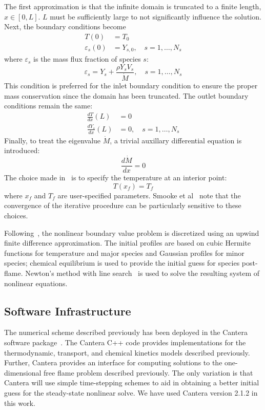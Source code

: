 The first approximation is that the infinite domain is truncated to a
finite length, $x\in[0,L]$. $L$ must be sufficiently large to not
significantly influence the solution. Next, the boundary conditions
become
%
\begin{align}
  T(0) &= T_0 \\
  \varepsilon_s(0) &= Y_{s,0}, \quad s = 1, \dots, N_s
\end{align}
%
where $\varepsilon_s$ is the mass flux fraction of species $s$:
%
\begin{equation}
  \varepsilon_s = Y_s + \frac{\rho Y_s V_s}{\dot{M}}, \quad s = 1, \dots, N_s
\end{equation}
%
This condition is preferred for the inlet boundary condition to ensure
the proper mass conservation since the domain has been truncated.
The outlet boundary conditions remain the same:
%
\begin{align}
  \frac{dT}{dx}(L) &= 0 \\
  \frac{dY_s}{dx}(L) &= 0, \quad s = 1, \dots, N_s
\end{align}
%
Finally, to treat the eigenvalue $\dot{M}$, a trivial auxillary
differential equation is introduced:
%
\begin{equation}
  \frac{d\dot{M}}{dx} = 0
\end{equation}
%
The choice made in~\cite{Smooke} is to specify the temperature at an
interior point:
%
\begin{equation}
  T(x_f) = T_f
\end{equation}
%
where $x_f$ and $T_f$ are user-specified parameters. Smooke et
al~\cite{Smooke} note that the convergence of the iterative procedure
can be particularly sensitive to these choices.

Following~\cite{Smooke}, the nonlinear boundary value problem is discretized using an upwind
finite difference approximation. The initial profiles are based on
cubic Hermite functions for temperature and major species and Gaussian
profiles for minor species; chemical equilibrium is used to provide
the initial guess for species post-flame. Newton's method with line
search~\cite{NocedalWright1999} is used to solve the resulting system
of nonlinear equations.

\subsection{Software Infrastructure}

The numerical scheme described previously has been deployed in the
Cantera software package~\cite{Cantera}. The Cantera C++ code provides
implementations for the thermodynamic, transport, and chemical
kinetics models described previously. Further, Cantera provides an
interface for computing solutions to the one-dimensional free flame
problem described previously. The only variation is that Cantera will
use simple time-stepping schemes to aid in obtaining a better initial
guess for the steady-state nonlinear solve. We have used Cantera
version 2.1.2 in this work.



